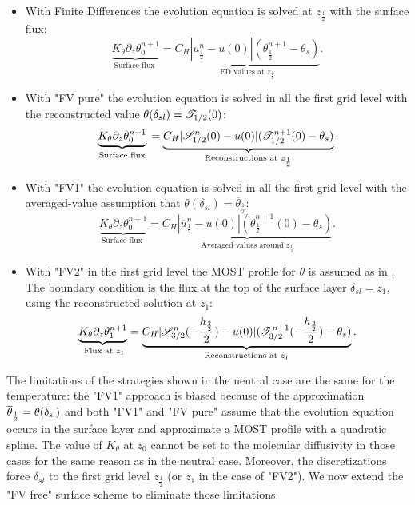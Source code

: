 \begin{itemize}
	\item With Finite Differences the evolution equation is
		solved at $z_{\frac{1}{2}}$ with the surface flux:
		\begin{equation}
			\underbrace{K_\theta
			\partial_z \theta_0^{n+1}}_{\text{
				Surface flux
			}} =
			\underbrace{C_H|u^n_{\frac{1}{2}}- u(0)|
			(\theta_{\frac{1}{2}}^{n+1}
			- \theta_s)}_{\text{FD values at }
			z_{\frac{1}{2}}}.
		\end{equation}
	\item With "FV pure" the evolution equation is solved in all
		the first grid level with the reconstructed
		value $\theta(\delta_{sl}) = {\cal T}_{1/2}(0)$:
		\begin{equation}
			\underbrace{K_\theta
			\partial_z \theta_0^{n+1}}_{\text{
				Surface flux
			}} =
			\underbrace{C_H
			|{\cal S}_{1/2}^{n}(0)- u(0)|
			({\cal T}_{1/2}^{n+1}(0)
			- \theta_s)}_{\text{Reconstructions at }
			z_{\frac{1}{2}}}.
		\end{equation}
	\item With "FV1" the evolution equation is solved in all
		the first grid level with the averaged-value
		assumption that $\theta(\delta_{sl}) =
		\overline{\theta}_{\frac{1}{2}}$:
		\begin{equation}
			\underbrace{K_\theta
			\partial_z \theta_0^{n+1}}_{\text{
				Surface flux
			}} =
			\underbrace{C_H
			|\overline{u}_{\frac{1}{2}}^n- u(0)|
			(\overline{\theta}_{\frac{1}{2}}^{n+1}(0)
			- \theta_s)}_{\text{Averaged values around }
			z_{\frac{1}{2}}}.
		\end{equation}
	\item With "FV2" in the first grid level
		the MOST profile for $\theta$ is assumed as in
		\cite{nishizawa_surface_2018}.
		The boundary condition is the flux at the top of the
		surface layer $\delta_{sl}=z_1$,
		using the reconstructed solution at $z_1$:
		\begin{equation}
			\underbrace{K_\theta
			\partial_z \theta^{n+1}_1}_{\text{
				Flux at
			} z_1} =
			\underbrace{C_H
			|{\cal S}_{3/2}^{n}(-\frac{h_\frac{3}{2}}{2})
			- u(0)|
			({\cal T}_{3/2}^{n+1}
			(-\frac{h_\frac{3}{2}}{2})
			- \theta_s)}_{\text{Reconstructions at }
			z_{1}}.
		\end{equation}
\end{itemize}
The limitations of the strategies shown in the neutral case are the
same for the temperature: the "FV1" approach is biased because
of the approximation
$\overline{\theta}_{\frac{1}{2}}=\theta(\delta_{\rm sl})$ and
both "FV1" and "FV pure" assume that the evolution equation occurs
in the surface layer and approximate a MOST profile with
a quadratic spline.
The value of $K_\theta$ at $z_0$ cannot be set to the molecular
diffusivity in those cases for the same reason as in the neutral case.
%
Moreover, the discretizations force $\delta_{sl}$ to the first
grid level $z_{\frac{1}{2}}$ (or $z_1$ in the case of "FV2").
We now extend the "FV free" surface scheme to eliminate those
limitations.
